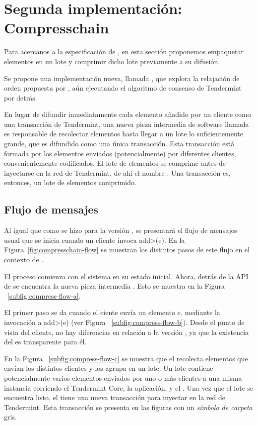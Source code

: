 \section{Segunda implementación: Compresschain}\label{sec:compresschain}

Para acercanos a la especificación de \setchain, en esta sección proponemos
empaquetar elementos en un lote y comprimir dicho lote
previamente a su difusión.
%

Se propone una implementación nueva, llamada \compresschain, que explora
la relajación de orden propuesta por \setchain, aún ejecutando el algoritmo de
consenso de Tendermint por detrás.
%

En lugar de difundir inmediatamente cada elemento añadido por un cliente como una
transacción de Tendermint, una nueva pieza intermedia de software llamada \collector
es responsable de recolectar elementos hasta llegar a un lote lo suficientemente grande,
que es difundido como una única transacción.
%
Esta transacción está formada por los elementos
enviados (potencialmente) por diferentes clientes, convenientemente codificados.
%
El lote de elementos se comprime antes de inyectarse en la red de Tendermint, de ahí el nombre
\compresschain.
%
Una transacción es, entonces, un lote de elementos comprimido.

\subsection{Flujo de mensajes}
Al igual que como se hizo para la versión \vanilla, se presentará el flujo de mensajes usual
que se inicia cuando un cliente invoca \<add>(e).
En la Figura~\ref{fig:compresschain-flow} se muestran los distintos pasos de
este flujo en el contexto de \compresschain.
%

El proceso comienza con el sistema en su estado inicial. Ahora, detrás de la API de \setchain
se encuentra la nueva pieza intermedia \collector. Esto se muestra en la Figura ~\ref{subfig:compress-flow-a}.

%

El primer paso se da cuando el ciente envía un elemento $e$, mediante la invocación a \<add>(e) (ver
Figura ~\ref{subfig:compress-flow-b}).
Desde el punto de vista del cliente, no hay diferencias en relación a la versión \vanilla, ya que
la existencia del \collector es transparente para él.

%

En la Figura ~\ref{subfig:compress-flow-c} se muestra que el \collector recolecta elementos que envían los distintos clientes y los agrupa
en un lote.
Un lote contiene potencialmente varios elementos enviados por uno o más clientes a una misma instancia
corriendo el Tendermint Core, la aplicación, y el \collector.
Una vez que el lote se encuentra listo, el \collector tiene una nueva transacción para inyectar en la red de Tendermint.
Esta transacción se presenta en las figuras con un \textit{símbolo de carpeta} gris.

